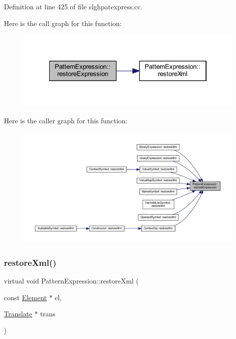 Definition at line 425 of file slghpatexpress.\+cc.

Here is the call graph for this function\+:
\nopagebreak
\begin{figure}[H]
\begin{center}
\leavevmode
\includegraphics[width=322pt]{class_pattern_expression_a77a394eabbb5d76013c19e7bc3455ea5_cgraph}
\end{center}
\end{figure}
Here is the caller graph for this function\+:
\nopagebreak
\begin{figure}[H]
\begin{center}
\leavevmode
\includegraphics[width=350pt]{class_pattern_expression_a77a394eabbb5d76013c19e7bc3455ea5_icgraph}
\end{center}
\end{figure}
\mbox{\label{class_pattern_expression_ad8986afdddbe7a8b64fdcf10478b5715}} 
\subsubsection{\texorpdfstring{restoreXml()}{restoreXml()}}
{\footnotesize\ttfamily virtual void Pattern\+Expression\+::restore\+Xml (\begin{DoxyParamCaption}\item[{const \mbox{\hyperlink{class_element}{Element}} $\ast$}]{el,  }\item[{\mbox{\hyperlink{class_translate}{Translate}} $\ast$}]{trans }\end{DoxyParamCaption})\hspace{0.3cm}{\ttfamily [pure virtual]}}



